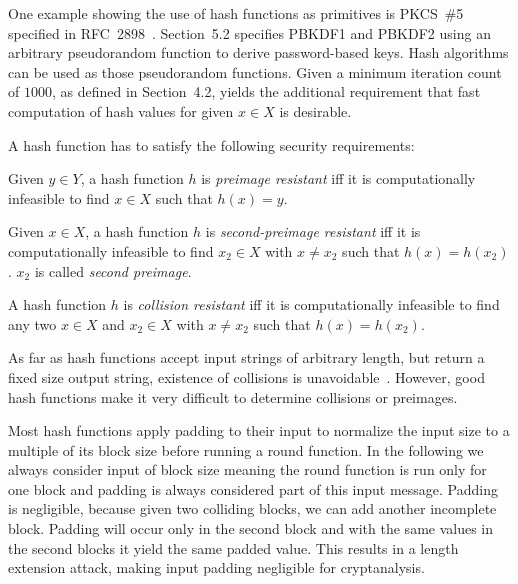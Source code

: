 One example showing the use of hash functions as primitives is  %
 PKCS~\#5
specified in RFC~2898~\cite{rfc2898}. Section~5.2 specifies PBKDF1 and PBKDF2
using an arbitrary pseudorandom function to derive password-based keys.
Hash algorithms can be used as those pseudorandom functions.
Given a minimum iteration count of $1000$, as defined in Section~4.2,
yields the additional requirement that fast computation of hash values
for given $x \in X$ is desirable.

A hash function has to satisfy the following security requirements:

\begin{defi}
  Given $y \in Y$,
  a hash function $h$ is \emph{preimage resistant} iff it is computationally infeasible
  to find $x \in X$ such that $h(x) = y$.
\end{defi}

\begin{defi}
  Given $x \in X$,
  a hash function $h$ is \emph{second-preimage resistant} iff it is computationally infeasible
  to find $x_2 \in X$ with $x \neq x_2$ such that $h(x) = h(x_2)$.
  $x_2$ is called \emph{second preimage}.
\end{defi}

\begin{defi}
  A hash function $h$ is \emph{collision resistant} iff it is computationally infeasible to
  find any two $x \in X$ and $x_2 \in X$ with $x \neq x_2$ such that $h(x) = h(x_2)$.
\end{defi}

As far as hash functions accept input strings of arbitrary length, but return a fixed
size output string, existence of collisions is unavoidable~\cite{schlaffer}.
However, good hash functions make it very difficult to determine collisions or preimages.

Most hash functions apply padding to their input to normalize the input size to a multiple
of its block size before running a round function. In the following we always consider
input of block size meaning the round function is run only for one block and padding is
always considered part of this input message. Padding is negligible, because given two
colliding blocks, we can add another incomplete block. Padding will occur only in the
second block and with the same values in the second blocks it yield the same padded value.
This results in a length extension attack, making input padding negligible for cryptanalysis.

